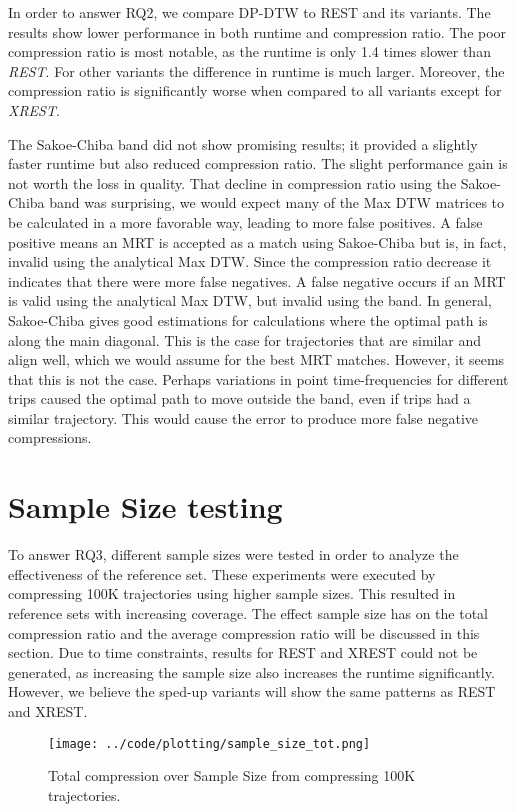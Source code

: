 In order to answer RQ2, we compare DP-DTW to REST and its variants. The results show lower performance in both runtime and compression ratio. The poor compression ratio is most notable, as the runtime is only 1.4 times slower than \textit{REST}. For other variants the difference in runtime is much larger. Moreover, the compression ratio is significantly worse when compared to all variants except for \textit{XREST}.

The Sakoe-Chiba band did not show promising results; it provided a slightly faster runtime but also reduced compression ratio. The slight performance gain is not worth the loss in quality. That decline in compression ratio using the Sakoe-Chiba band was surprising, we would expect many of the Max DTW matrices to be calculated in a more favorable way, leading to more false positives. A false positive means an MRT is accepted as a match using Sakoe-Chiba but is, in fact, invalid using the analytical Max DTW. Since the compression ratio decrease it indicates that there were more false negatives. A false negative occurs if an MRT is valid using the analytical Max DTW, but invalid using the band. In general, Sakoe-Chiba gives good estimations for calculations where the optimal path is along the main diagonal. This is the case for trajectories that are similar and align well, which we would assume for the best MRT matches. However, it seems that this is not the case. Perhaps variations in point time-frequencies for different trips caused the optimal path to move outside the band, even if trips had a similar trajectory. This would cause the error to produce more false negative compressions.

\section{Sample Size testing}\label{sec:sample_size}
To answer RQ3, different sample sizes were tested in order to analyze the effectiveness of the reference set. These experiments were executed by compressing 100K trajectories using higher sample sizes. This resulted in reference sets with increasing coverage. The effect sample size has on the total compression ratio and the average compression ratio will be discussed in this section. Due to time constraints, results for REST and XREST could not be generated, as increasing the sample size also increases the runtime significantly. However, we believe the sped-up variants will show the same patterns as REST and XREST.

\begin{figure}[h]
    \begin{minipage}{0.99\linewidth}
        \centering
        \texttt{[image: ../code/plotting/sample\_size\_tot.png]}
        \caption{Total compression over Sample Size from compressing 100K trajectories.}
        \label{fig:sample_tot}
    \end{minipage}
\end{figure}

